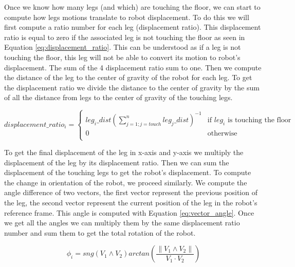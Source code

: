             Once we know how many legs (and which) are touching the floor, we can start to compute how legs motions translate to robot displacement. To do this we will first compute a ratio number for each leg (displacement ratio). This displacement ratio is equal to zero if the associated leg is not touching the floor as seen in Equation \ref{eq:displacement_ratio}. This can be understood as if a leg is not touching the floor, this leg will not be able to convert its motion to robot's displacement. The sum of the 4 displacement ratio sum to one. Then we compute the distance of the leg to the center of gravity of the robot for each leg. To get the displacement ratio we divide the distance to the center of gravity by the sum of all the distance from legs to the center of gravity of the touching legs.

            \begin{equation}
                displacement\_ratio_i = 
                \begin{cases}
                  leg_i\_dist \left(\sum_{j=1;j=touch}^{n}leg_j\_dist\right)^{-1} & \text{if $leg_i$ is touching the floor}\\
                  0 & \text{otherwise}\\
                \end{cases}  
                \label{eq:displacement_ratio}
            \end{equation}
            
            To get the final displacement of the leg in x-axis and y-axis we multiply the displacement of the leg by its displacement ratio. Then we can sum the displacement of the touching legs to get the robot's displacement.
            To compute the change in orientation of the robot, we proceed similarly. We compute the angle difference of two vectors, the first vector represent the previous position of the leg, the second vector represent the current position of the leg in the robot's reference frame. This angle is computed with Equation \ref{eq:vector_angle}. Once we get all the angles we can multiply them by the same displacement ratio number and sum them to get the total rotation of the robot.

            \begin{equation}
                \phi_i = sng(V_1 \wedge V_2) arctan\left(\frac{\lVert V_1 \wedge V_2 \rVert}{V_1 \cdot V_2}\right)
                \label{eq:vector_angle}
            \end{equation}
            
